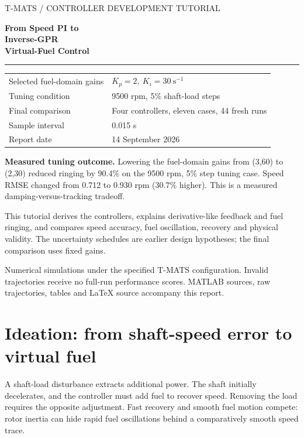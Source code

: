 \documentclass[11pt,a4paper]{article}
\begin{document}
\begin{titlepage}
\color{navy}\sffamily
{\small T-MATS / CONTROLLER DEVELOPMENT TUTORIAL}\par\vspace{18mm}
{\fontsize{30}{36}\selectfont\bfseries From Speed PI to\\Inverse-GPR\\Virtual-Fuel Control\par}
\vspace{9mm}{\Large Ideation, derivation, uncertainty experiments,\\and fixed-gain retuning for reduced fuel ringing\par}
\vspace{10mm}\color{teal}\rule{\linewidth}{1.2pt}\color{navy}\vspace{8mm}
\begin{tabular}{@{}ll}
Selected fuel-domain gains & $K_p=2,\ K_i=30\ \mathrm{s}^{-1}$\\[5pt]
Tuning condition & 9500 rpm, 5\% shaft-load steps\\[5pt]
Final comparison & Four controllers, eleven cases, 44 fresh runs\\[5pt]
Sample interval & 0.015 s\\[5pt]
Report date & 14 September 2026
\end{tabular}
\par\vspace{12mm}\normalfont\color{ink}
\textbf{Measured tuning outcome.} Lowering the fuel-domain gains from (3,60) to (2,30) reduced ringing by 90.4\% on the 9500 rpm, 5\% step tuning case. Speed RMSE changed from 0.712 to 0.930 rpm (30.7\% higher). This is a measured damping-versus-tracking tradeoff.

This tutorial derives the controllers, explains derivative-like feedback and fuel ringing, and compares speed accuracy, fuel oscillation, recovery and physical validity. The uncertainty schedules are earlier design hypotheses; the final comparison uses fixed gains.

\vfill Numerical simulations under the specified T-MATS configuration. Invalid trajectories receive no full-run performance scores. MATLAB sources, raw trajectories, tables and LaTeX source accompany this report.
\end{titlepage}
\tableofcontents\clearpage
\section{Ideation: from shaft-speed error to virtual fuel}
A shaft-load disturbance extracts additional power. The shaft initially decelerates, and the controller must add fuel to recover speed. Removing the load requires the opposite adjustment. Fast recovery and smooth fuel motion compete: rotor inertia can hide rapid fuel oscillations behind a comparatively smooth speed trace.
\end{document}
